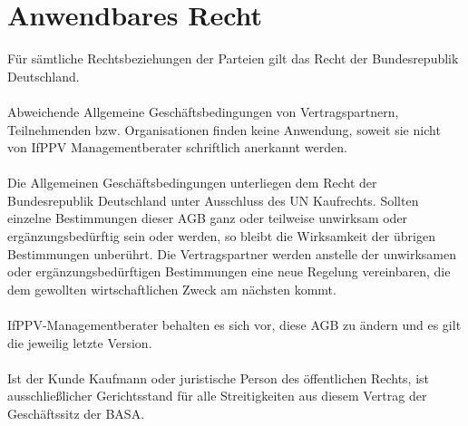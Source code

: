 \documentclass[a4paper, 12pt]{scrartcl}
\begin{document}
    \section{Anwendbares Recht}
    F\"ur s\"amtliche Rechtsbeziehungen der Parteien gilt das Recht der Bundesrepublik Deutschland. \\ \\ \noindent
Abweichende Allgemeine Gesch\"aftsbedingungen von Vertragspartnern, Teilnehmenden bzw. Organisationen finden keine Anwendung, soweit sie nicht von IfPPV Managementberater schriftlich anerkannt werden. \\ \\ \noindent
Die Allgemeinen Gesch\"aftsbedingungen unterliegen dem Recht der Bundesrepublik Deutschland unter Ausschluss des UN Kaufrechts.
Sollten einzelne Bestimmungen dieser AGB ganz oder teilweise unwirksam oder erg\"anzungsbed\"urftig sein oder werden, so bleibt die Wirksamkeit der \"ubrigen Bestimmungen unber\"uhrt. Die Vertragspartner werden anstelle der unwirksamen oder erg\"anzungsbed\"urftigen Bestimmungen eine neue Regelung vereinbaren, die dem gewollten wirtschaftlichen Zweck am n\"achsten kommt. \\ \\ \noindent
IfPPV-Managementberater behalten es sich vor, diese AGB zu \"andern und es gilt die jeweilig letzte Version. \\ \\ \noindent
Ist der Kunde Kaufmann oder juristische Person des \"offentlichen Rechts, ist ausschließlicher Gerichtsstand f\"ur alle Streitigkeiten aus diesem Vertrag der Gesch\"aftssitz der BASA.
    \newpage
\end{document}
